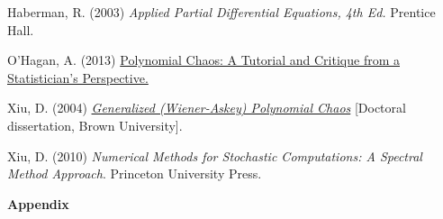 \documentclass[11pt]{article}
\numberwithin{equation}{section}
\begin{document}
\begin{thebibliography}{9}

 Haberman, R. (2003) {\em Applied Partial Differential Equations, 4th Ed.} Prentice Hall.

 O'Hagan, A. (2013) \href{http://tonyohagan.co.uk/academic/pdf/Polynomial-chaos.pdf}{Polynomial Chaos: A Tutorial and Critique from a Statistician's Perspective.}


 Xiu, D. (2004) \href{https://www.brown.edu/research/projects/crunch/sites/brown.edu.research.projects.crunch/files/uploads/Dongbin\%20Xiu\%20Thesis.pdf}{\em Generalized (Wiener-Askey) Polynomial Chaos} [Doctoral dissertation, Brown University].

 Xiu, D. (2010) {\em Numerical Methods for Stochastic Computations: A Spectral Method Approach}. Princeton University Press.

\end{thebibliography}




\pagebreak 

\textbf{Appendix} \label{app:hermite2d}
\end{document}
